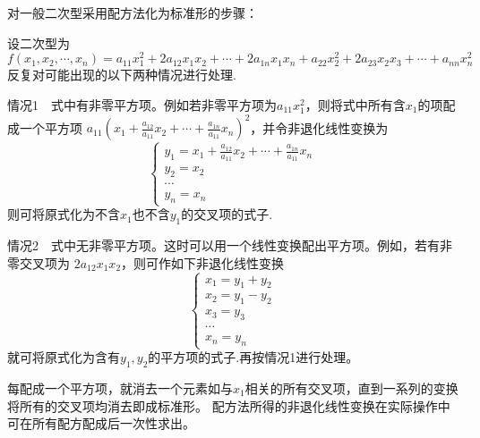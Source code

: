 \begin{theorem}
    对一般二次型采用配方法化为标准形的步骤：

    设二次型为$$f(x_1,x_2,\cdots,x_n)=a_{11}x_1^2+2a_{12}x_1x_2+\cdots+2a_{1n}x_1x_n+a_{22}x_2^2+2a_{23}x_2x_3+\cdots+a_{nn}x_n^2$$
    反复对可能出现的以下两种情况进行处理.

    {\heiti 情况1}$\quad$式中有非零平方项。例如若非零平方项为$a_{11}x_1^2$，则将式中所有含$x_1$的项配成一个平方项
    $\displaystyle{}{a_{11}{\left(x_1+\frac{a_{12}}{a_{11}}x_2+\cdots+\frac{a_{1n}}{a_{11}}x_n\right)}^2}$，并令非退化线性变换为
    $$\left\{\begin{array}{l}
        \displaystyle{y_1=x_1+\frac{a_{12}}{a_{11}}x_2+\cdots+\frac{a_{1n}}{a_{11}}x_n}\\
        y_2=x_2\\
        \cdots\\
        y_n=x_n
    \end{array}\right.$$
    则可将原式化为不含$x_1$也不含$y_1$的交叉项的式子.

    {\heiti 情况2}$\quad$式中无非零平方项。这时可以用一个线性变换配出平方项。例如，若有非零交叉项为
    $2a_{12}x_1x_2$，则可作如下非退化线性变换
    $$\left\{\begin{array}{l}
        x_1=y_1+y_2\\
        x_2=y_1-y_2\\
        x_3=y_3\\
        \cdots\\
        x_n=y_n
    \end{array}\right.$$
    就可将原式化为含有$y_1,y_2$的平方项的式子.再按情况1进行处理。

    每配成一个平方项，就消去一个元素如与$x_1$相关的所有交叉项，直到一系列的变换将所有的交叉项均消去即成标准形。
    配方法所得的非退化线性变换在实际操作中可在所有配方配成后一次性求出。
\end{theorem}

